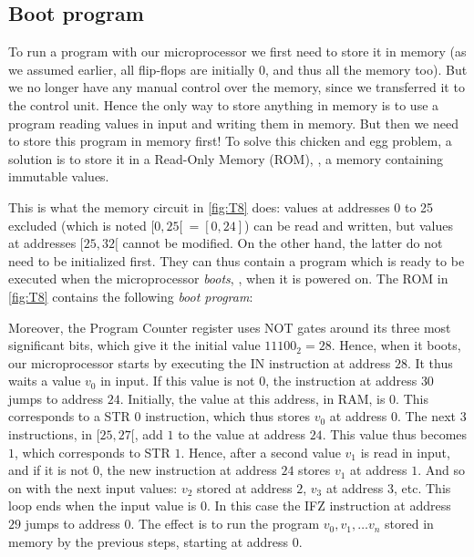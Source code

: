 \subsection{Boot program}\label{subsection:toy-boot-program}

To run a program with our microprocessor we first need to store it in memory
(as we assumed earlier, all flip-flops are initially $0$, and thus all the
memory too). But we no longer have any manual control over the memory, since we
transferred it to the control unit. Hence the only way to store anything in
memory is to use a program reading values in input and writing them in memory.
But then we need to store this program in memory first! To solve this chicken
and egg problem, a solution is to store it in a Read-Only Memory (ROM), \ie, a
memory containing immutable values.

This is what the memory circuit in \cref{fig:T8} does: values at addresses 0 to
25 excluded (which is noted $[0, 25[\ = [0, 24]$) can be read and written, but
values at addresses $[25, 32[$ cannot be modified. On the other hand, the
latter do not need to be initialized first. They can thus contain a program
which is ready to be executed when the microprocessor {\em boots}, \ie, when it
is powered on. The ROM in \cref{fig:T8} contains the following {\em boot
program}:


Moreover, the Program Counter register uses NOT gates around its three most
significant bits, which give it the initial value $11100_2=28$. Hence, when it
boots, our microprocessor starts by executing the IN instruction at address
$28$. It thus waits a value $v_0$ in input. If this value is not $0$, the
instruction at address $30$ jumps to address $24$. Initially, the value at this
address, in RAM, is $0$. This corresponds to a STR $0$ instruction, which thus
stores $v_0$ at address $0$. The next 3 instructions, in $[25,27[$, add $1$ to
the value at address $24$. This value thus becomes $1$, which corresponds to
STR $1$. Hence, after a second value $v_1$ is read in input, and if it is not
$0$, the new instruction at address $24$ stores $v_1$ at address $1$. And so on
with the next input values: $v_2$ stored at address $2$, $v_3$ at address $3$,
etc. This loop ends when the input value is $0$. In this case the IFZ
instruction at address $29$ jumps to address $0$. The effect is to run the
program $v_0, v_1, \ldots v_n$ stored in memory by the previous steps, starting
at address $0$.

